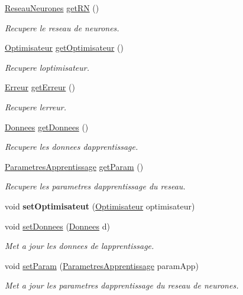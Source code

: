 \begin{DoxyCompactItemize}
\hyperlink{classReseauNeurones}{Reseau\+Neurones} \hyperlink{classApprentissage_a56d2b6eff05342d1482bfed2a947b60d}{get\+RN} ()
\begin{DoxyCompactList}\small\item\em Recupere le reseau de neurones. \end{DoxyCompactList}\item 
\hyperlink{classOptimisateur}{Optimisateur} \hyperlink{classApprentissage_af3fdf7d92ebf36d3edb6c4d06addc8e6}{get\+Optimisateur} ()
\begin{DoxyCompactList}\small\item\em Recupere l\textquotesingle{}optimisateur. \end{DoxyCompactList}\item 
\hyperlink{classErreur}{Erreur} \hyperlink{classApprentissage_a9df18f6e95729c7263a2ab1fa9a0df8f}{get\+Erreur} ()
\begin{DoxyCompactList}\small\item\em Recupere l\textquotesingle{}erreur. \end{DoxyCompactList}\item 
\hyperlink{classDonnees}{Donnees} \hyperlink{classApprentissage_ac9fbf481a1bc46c15a36129c1eba3796}{get\+Donnees} ()
\begin{DoxyCompactList}\small\item\em Recupere les donnees d\textquotesingle{}apprentissage. \end{DoxyCompactList}\item 
\hyperlink{classParametresApprentissage}{Parametres\+Apprentissage} \hyperlink{classApprentissage_a025d66e8c5edb1c4c6ce9f3d8c983395}{get\+Param} ()
\begin{DoxyCompactList}\small\item\em Recupere les parametres d\textquotesingle{}apprentissage du reseau. \end{DoxyCompactList}\item 
\mbox{\label{classApprentissage_a03a3f022cc45f90670f744a7a4cfaf4d}} 
void {\bfseries set\+Optimisateut} (\hyperlink{classOptimisateur}{Optimisateur} optimisateur)
\item 
void \hyperlink{classApprentissage_a2e16d329d73dad8f771ccb9b7fee3931}{set\+Donnees} (\hyperlink{classDonnees}{Donnees} d)
\begin{DoxyCompactList}\small\item\em Met a jour les donnees de l\textquotesingle{}apprentissage. \end{DoxyCompactList}\item 
void \hyperlink{classApprentissage_a61b1b8bc359935c1de479a72241acb9c}{set\+Param} (\hyperlink{classParametresApprentissage}{Parametres\+Apprentissage} param\+App)
\begin{DoxyCompactList}\small\item\em Met a jour les parametres d\textquotesingle{}apprentissage du reseau de neurones. \end{DoxyCompactList}\end{DoxyCompactItemize}



